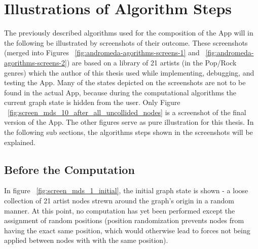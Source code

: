 \section{Illustrations of Algorithm Steps}

The previously described algorithms used for the composition of the App will in the following be illustrated by screenshots of their outcome. These screenshots (merged into Figures ~\ref{fig:andromeda-agorithms-screens-1} and ~\ref{fig:andromeda-agorithms-screens-2}) are based on a library of 21 artists (in the Pop/Rock genres) which the author of this thesis used while implementing, debugging, and testing the App. Many of the states depicted on the screenshots are not to be found in the actual App, because during the computational algorithms the current graph state is hidden from the user. Only Figure ~\ref{fig:screen_mds_10_after_all_uncollided_nodes} is a screenshot of the final version of the App. The other figures serve as pure illustration for this thesis. In the following sub sections, the algorithms steps shown in the screenshots will be explained.

\subsection{Before the Computation}

In figure ~\ref{fig:screen_mds_1_initial}, the initial graph state is shown - a loose collection of 21 artist nodes strewn around the graph's origin in a random manner. At this point, no computation has yet been performed except the assignment of random positions (position randomization prevents nodes from having the exact same position, which would otherwise lead to forces not being applied between nodes with with the same position).

